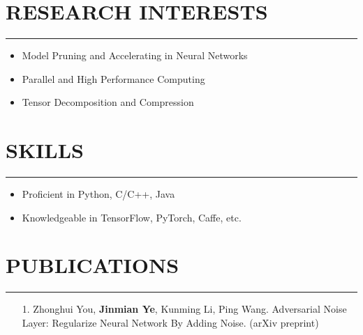 \documentclass{res}
\begin{document}
\begin{resume}
\section{RESEARCH INTERESTS}
\vspace{-1ex}
\noindent\rule[0.1\baselineskip]{\textwidth}{1pt}
\begin{itemize}\setlength{\itemsep}{-0.5ex}
    \item Model Pruning and Accelerating in Neural Networks
    \item Parallel and High Performance Computing
    \item Tensor Decomposition and Compression
\end{itemize}





\section{SKILLS}
\vspace{-1ex}
\noindent\rule[0.1\baselineskip]{\textwidth}{1pt}
\begin{itemize}\setlength{\itemsep}{-0.5ex}
\item Proficient in Python, C/C++, Java
\item Knowledgeable in TensorFlow, PyTorch, Caffe, etc.
\end{itemize}


\section{PUBLICATIONS}
\vspace{-1ex}
\noindent\rule[0.1\baselineskip]{\textwidth}{1pt}
\begin{itemize}\setlength{\itemsep}{-0.5ex}
    \item[1.] Zhonghui You, \textbf{Jinmian Ye}, Kunming Li,  Ping Wang. Adversarial Noise Layer: Regularize Neural Network By Adding Noise. (arXiv preprint)
    

\end{itemize}
\end{resume}
\end{document}
